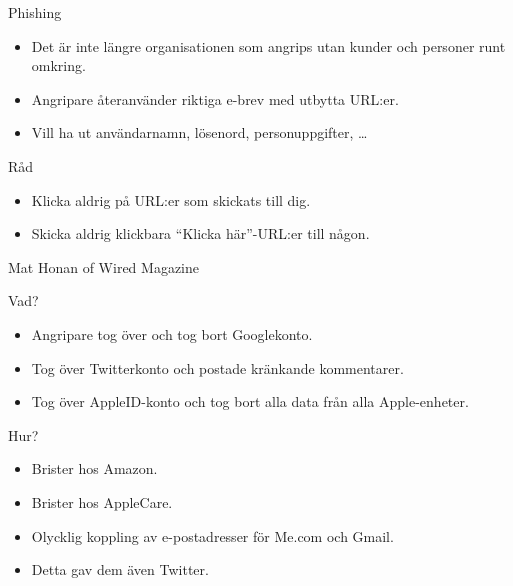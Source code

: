 \documentclass{beamer}
\begin{document}
\begin{frame}{\insertsubsectionhead}{Phishing}
  \begin{itemize}
    \item Det är inte längre organisationen som angrips utan kunder och 
      personer runt omkring.

    \item Angripare återanvänder riktiga e-brev med utbytta URL:er.

    \item Vill ha ut användarnamn, lösenord, personuppgifter, \dots
  \end{itemize}

  \begin{block}{Råd}
    \begin{itemize}
      \item Klicka aldrig på URL:er som skickats till dig.
      \item Skicka aldrig klickbara \enquote{Klicka här}-URL:er till någon.
    \end{itemize}
  \end{block}

\end{frame}

\begin{frame}{\insertsubsectionhead}{Mat Honan of Wired Magazine}
  \begin{block}{Vad?}
    \begin{itemize}
      \item Angripare tog över och tog bort Googlekonto.
      \item Tog över Twitterkonto och postade kränkande kommentarer.
      \item Tog över AppleID-konto och tog bort alla data från alla 
        Apple-enheter.
    \end{itemize}
  \end{block}
  \begin{block}{Hur?}
    \begin{itemize}
      \item Brister hos Amazon.
      \item Brister hos AppleCare.
      \item Olycklig koppling av e-postadresser för Me.com och Gmail.
      \item Detta gav dem även Twitter.
    \end{itemize}
  \end{block}
\end{frame}
\end{document}
